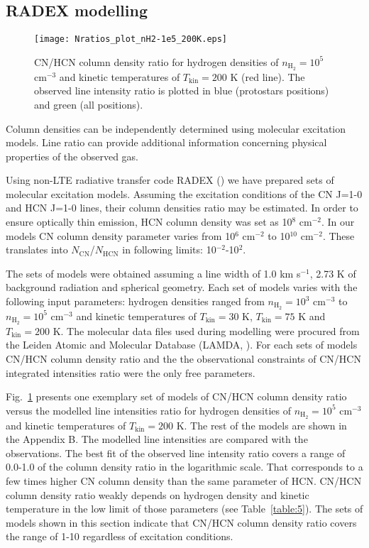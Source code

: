 \documentclass{aa}
\begin{document}
\subsection{RADEX modelling}

\begin{figure}
   \centering
   \texttt{[image: Nratios\_plot\_nH2-1e5\_200K.eps]}
      \caption{CN/HCN column density ratio for hydrogen densities of $n_\mathrm{H_2} = 10^5$ cm$^{-3}$ and kinetic temperatures of $T_\mathrm{kin} = 200$ K (red line). The observed line intensity ratio is plotted in blue (protostars positions) and green (all positions).}
         \label{1e5_75K}
\end{figure}

Column densities can be independently determined using molecular excitation models. Line ratio can provide additional information concerning physical properties of the observed gas. 

Using non-LTE radiative transfer code RADEX (\citealt{vdT07}) we have prepared sets of molecular excitation models. Assuming the excitation conditions of the CN J=1-0 and HCN J=1-0 lines, their column densities ratio may be estimated. In order to ensure optically thin emission, HCN column density was set as 10$^8$ cm$^{-2}$. In our models CN column density parameter varies from 10$^6$ cm$^{-2}$ to 10$^{10}$ cm$^{-2}$. These translates into $N_\mathrm{CN}$/$N_\mathrm{HCN}$ in following limits: 10$^{-2}$-10$^{2}$. 

The sets of models were obtained assuming a line width of 1.0 km s$^{-1}$, 2.73 K of background radiation and spherical geometry. Each set of models varies with the following input parameters:  hydrogen densities ranged from $n_\mathrm{H_2} = 10^3$ cm$^{-3}$ to $n_\mathrm{H_2} = 10^5$ cm$^{-3}$ and kinetic temperatures of $T_\mathrm{kin} = 30$ K, $T_\mathrm{kin} = 75$ K and $T_\mathrm{kin} =200$ K. The molecular data files used during modelling were procured from the Leiden Atomic and Molecular Database (LAMDA, \citealt{Sch05}). For each sets of models CN/HCN column density ratio and the the observational constraints of CN/HCN integrated intensities ratio were the only free parameters. 

Fig.~\ref{1e5_75K} presents one exemplary set of models of CN/HCN column density ratio versus the modelled line intensities ratio for hydrogen densities of $n_\mathrm{H_2} = 10^5$ cm$^{-3}$ and kinetic temperatures of $T_\mathrm{kin} = 200$ K. The rest of the models are shown in the Appendix B. The modelled line intensities are compared with the observations. The best fit of the observed line intensity ratio covers a range of \mbox{0.0-1.0} of the column density ratio in the logarithmic scale. That corresponds to a few times higher CN column density than the same parameter of HCN. CN/HCN column density ratio weakly depends on hydrogen density and kinetic temperature in the low limit of those parameters (see Table~\ref{table:5}). The sets of models shown in this section indicate that CN/HCN column density ratio covers the range of 1-10 regardless of excitation conditions.
\end{document}
